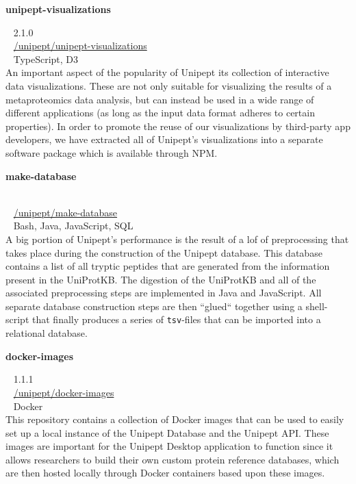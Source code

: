 \pagebreak

\begin{large}\textbf{\textsf{unipept-visualizations}}\end{large} \hfill \faTag ~ \textsf{2.1.0} \\
\faGithub ~ \href{https://github.com/unipept/unipept-visualizations}{\textsf{/unipept/unipept-visualizations}} \\
\faCode ~ \textsf{TypeScript, D3} \\
An important aspect of the popularity of Unipept its collection of interactive data visualizations.
These are not only suitable for visualizing the results of a metaproteomics data analysis, but can instead be used in a wide range of different applications (as long as the input data format adheres to certain properties).
In order to promote the reuse of our visualizations by third-party app developers, we have extracted all of Unipept's visualizations into a separate software package which is available through NPM.

\begin{large}\textbf{\textsf{make-database}}\end{large} \\
\faGithub ~ \href{https://github.com/unipept/make-database}{\textsf{/unipept/make-database}} \\
\faCode ~ \textsf{Bash, Java, JavaScript, SQL} \\
A big portion of Unipept's performance is the result of a lof of preprocessing that takes place during the construction of the Unipept database.
This database contains a list of all tryptic peptides that are generated from the information present in the UniProtKB.
The digestion of the UniProtKB and all of the associated preprocessing steps are implemented in Java and JavaScript.
All separate database construction steps are then ``glued`` together using a shell-script that finally produces a series of \texttt{tsv}-files that can be imported into a relational database.

\begin{large}\textbf{\textsf{docker-images}}\end{large} \hfill \faTag ~ \textsf{1.1.1} \\
\faGithub ~ \href{https://github.com/unipept/docker-images}{\textsf{/unipept/docker-images}} \\
\faCode ~ \textsf{Docker} \\
This repository contains a collection of Docker images that can be used to easily set up a local instance of the Unipept Database and the Unipept API.
These images are important for the Unipept Desktop application to function since it allows researchers to build their own custom protein reference databases, which are then hosted locally through Docker containers based upon these images.

